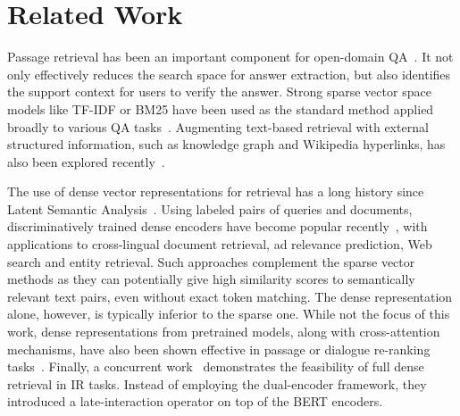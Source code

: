 

\section{Related Work}
\label{sec:related}


Passage retrieval has been %
an important component for open-domain QA~\cite{voorhees1999trec}.
It not only effectively reduces the search space for answer extraction, but also identifies the support context for users to verify the answer.
Strong sparse vector space models like TF-IDF or BM25 have been used as the standard method applied broadly to various QA tasks~\citep[e.g.,][]{chen2017reading, yang2019end, Yang2019Data, nie2019revealing, min2019discrete, wolfson2020break}.
Augmenting text-based retrieval with external structured information, such as knowledge graph and Wikipedia hyperlinks, has also been explored recently~\cite{min2019knowledge,asai2020learning}.


The use of dense vector representations for retrieval has a long history since Latent Semantic Analysis~\cite{deerwester1990indexing}.
Using labeled pairs of queries and documents, discriminatively trained dense encoders have become popular recently~\cite{yih2011learning, huang2013learning, gillick-etal-2019-learning}, with applications to cross-lingual document retrieval, ad relevance prediction, Web search and entity retrieval. Such approaches complement the sparse vector methods as they can potentially give high similarity scores to semantically relevant text pairs, even without exact token matching. The dense representation alone, however, is typically inferior to the sparse one.
While not the focus of this work, dense representations from pretrained models, along with cross-attention mechanisms, have also been shown effective in passage or dialogue re-ranking tasks~\cite{nogueira2019passage,humeau2020poly}. 
Finally, a concurrent work~\cite{khattab2020colbert} demonstrates the feasibility of full dense retrieval in IR tasks. Instead of employing the dual-encoder framework, they introduced a late-interaction operator on top of the BERT encoders.






